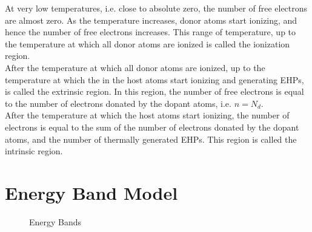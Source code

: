 \documentclass[titlepage, fleqn, a4paper, 12pt, twoside]{article}
\theoremstyle{definition}
\theoremstyle{theorem}
\let\Oldsection\section
\renewcommand{\section}{\FloatBarrier\Oldsection}
\begin{document}
At very low temperatures, i.e. close to absolute zero, the number of free electrons are almost zero.
As the temperature increases, donor atoms start ionizing, and hence the number of free electrons increases.
This range of temperature, up to the temperature at which all donor atoms are ionized is called the ionization region.\\
After the temperature at which all donor atoms are ionized, up to the temperature at which the in the host atoms start ionizing and generating EHPs, is called the extrinsic region.
In this region, the number of free electrons is equal to the number of electrons donated by the dopant atoms, i.e. $n = N_d$.\\
After the temperature at which the host atoms start ionizing, the number of electrons is equal to the sum of the number of electrons donated by the dopant atoms, and the number of thermally generated EHPs.
This region is called the intrinsic region.

\section{Energy Band Model}

\begin{figure}[h]
	\centering
	\caption{Energy Bands}
\end{figure}
\end{document}
